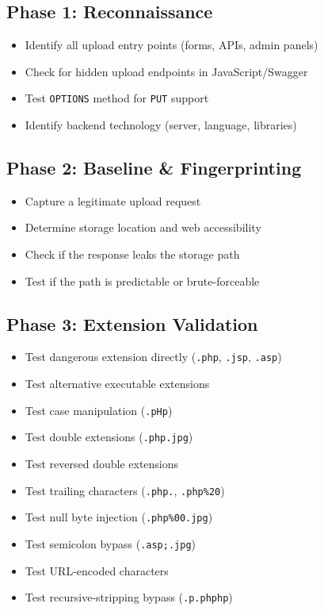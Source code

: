 \documentclass[11pt]{article}
\begin{document}
\begin{checklistbox}
\subsection*{Phase 1: Reconnaissance}
\begin{itemize}
    \item[$\square$] Identify all upload entry points (forms, APIs, admin panels)
    \item[$\square$] Check for hidden upload endpoints in JavaScript/Swagger
    \item[$\square$] Test \texttt{OPTIONS} method for \texttt{PUT} support
    \item[$\square$] Identify backend technology (server, language, libraries)
\end{itemize}

\subsection*{Phase 2: Baseline \& Fingerprinting}
\begin{itemize}
    \item[$\square$] Capture a legitimate upload request
    \item[$\square$] Determine storage location and web accessibility
    \item[$\square$] Check if the response leaks the storage path
    \item[$\square$] Test if the path is predictable or brute-forceable
\end{itemize}

\subsection*{Phase 3: Extension Validation}
\begin{itemize}
    \item[$\square$] Test dangerous extension directly (\texttt{.php}, \texttt{.jsp}, \texttt{.asp})
    \item[$\square$] Test alternative executable extensions
    \item[$\square$] Test case manipulation (\texttt{.pHp})
    \item[$\square$] Test double extensions (\texttt{.php.jpg})
    \item[$\square$] Test reversed double extensions
    \item[$\square$] Test trailing characters (\texttt{.php.}, \texttt{.php\%20})
    \item[$\square$] Test null byte injection (\texttt{.php\%00.jpg})
    \item[$\square$] Test semicolon bypass (\texttt{.asp;.jpg})
    \item[$\square$] Test URL-encoded characters
    \item[$\square$] Test recursive-stripping bypass (\texttt{.p.phphp})
\end{itemize}


\end{checklistbox}
\end{document}
